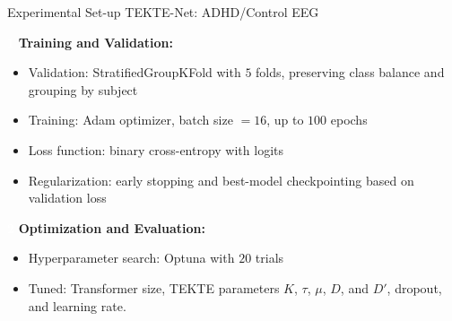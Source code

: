 \documentclass[aspectratio=169]{beamer}
\begin{document}
\begin{frame}{Experimental Set-up TEKTE-Net: ADHD/Control EEG}

\setlength{\leftmargini}{1.4em}
\setlength{\fboxsep}{1.2pt}

\vspace{0.35cm}

\noindent
\colorbox{frameblue}{\textcolor{white}{\textbf{\scriptsize 1}}}
\hspace{0.12cm}
\textbf{\normalsize Training and Validation:}

\vspace{0.04cm}

\begin{itemize}\itemsep2pt
    \item Validation: StratifiedGroupKFold with $5$ folds, preserving class balance and grouping by subject
    \item Training: Adam optimizer, batch size $=16$, up to $100$ epochs
    \item Loss function: binary cross-entropy with logits
    \item Regularization: early stopping and best-model checkpointing based on validation loss
\end{itemize}

\vspace{0.18cm}

\noindent
\colorbox{frameblue}{\textcolor{white}{\textbf{\scriptsize 2}}}
\hspace{0.12cm}
\textbf{\normalsize Optimization and Evaluation:}

\vspace{0.04cm}

\begin{itemize}\itemsep2pt
    \item Hyperparameter search: Optuna with $20$ trials
    \item Tuned: Transformer size, TEKTE parameters $K$, $\tau$, $\mu$, $D$, and $D'$, dropout, and learning rate.
\end{itemize}

\end{frame}
\end{document}
